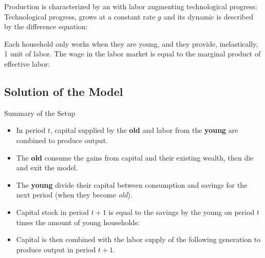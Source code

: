 \documentclass[10pt,usenames,dvipsnames]{beamer}
\begin{document}
\begin{frame}
Production is characterized by an  with labor augmenting technological progress:
\pause
Technological progress, grows at a constant rate $g$ and its dynamic is described by the difference equation:
\end{frame}

\begin{frame}
Each household only works when they are young, and they provide, inelastically, 1 unit of labor. The wage in the labor market is equal to the marginal product of effective labor:
\end{frame}

\subsection{Solution of the Model}

\begin{frame}{Summary of the Setup}
\begin{itemize}
\item In period $t$, capital supplied by the \textbf{old} and labor from the \textbf{young} are combined to produce output.
\item The \textbf{old} consume the gains from capital and their existing wealth, then die and exit the model.
\item The \textbf{young} divide their capital between consumption and savings for the next period (when they become \textit{old}).
\item Capital stock in period $t+1$ is equal to the savings by the young on period $t$ times the amount of young households:
\item Capital is then combined with the labor supply of the following generation to produce output in period $t+1$.
\end{itemize}
\end{frame}
\end{document}
